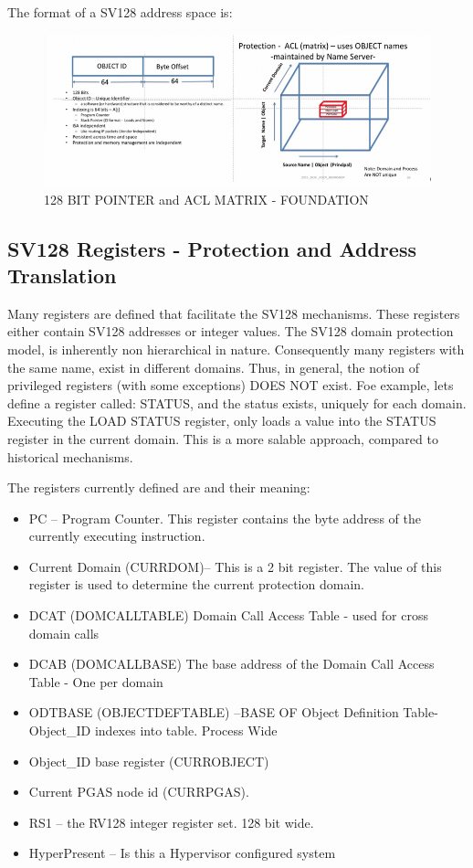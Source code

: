 \documentclass{article}
\begin{document}
The format of a SV128 address space is:

\begin{figure}[h]
\includegraphics[scale = .5] 
{figures/figure1a.jpg}
\caption {128  BIT POINTER and ACL MATRIX  - FOUNDATION}
\end{figure}
\pagebreak
\subsection {SV128 Registers -  Protection and Address Translation}

Many registers are defined that facilitate the SV128 mechanisms.   These registers either contain SV128 addresses or integer values.  The SV128 domain protection model, is inherently non hierarchical in nature. Consequently many registers with the same name, exist in different domains. Thus, in general,  the notion of privileged registers (with some exceptions) DOES NOT exist.  Foe example,  lets define a register called:  STATUS, and the status exists, uniquely for each domain.  Executing the LOAD STATUS register,  only loads a value  into the STATUS register in the current domain.  This is a more salable approach, compared to historical mechanisms.




The registers currently defined are and their meaning:



\begin {itemize}
\item PC – Program Counter. This register contains the byte address of the currently executing instruction.
\item Current Domain  (CURRDOM)– This is a 2 bit register.  The value of this register is used to determine the current protection domain.
\item DCAT (DOMCALLTABLE) Domain Call Access Table - used for cross domain calls
\item DCAB (DOMCALLBASE) The base address of the Domain Call Access Table - One per  domain
\item ODTBASE (OBJECTDEFTABLE) –BASE OF Object Definition Table- Object\_ID indexes into table.  Process Wide
\item Object\_ID  base register (CURROBJECT)
\item Current PGAS node id (CURRPGAS).
\item RS1 – the RV128 integer register set.  128 bit wide.
\item HyperPresent – Is this a Hypervisor configured system

\end{itemize}
\end{document}

